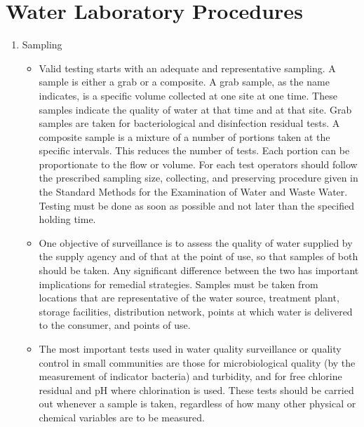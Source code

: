 
\chapter{Water Laboratory Procedures}

\begin{enumerate}
\item Sampling\\
\begin{itemize}
\item Valid testing starts with an adequate and representative sampling. A sample is either a grab or a composite. A grab sample, as the name indicates, is a specific volume collected at one site at one time. These samples indicate the quality of water at that time and at that site. Grab samples are taken for bacteriological and disinfection residual tests. A composite sample is a mixture of a number of portions taken at the specific intervals. This reduces the number of tests. Each portion can be proportionate to the flow or volume. For each test operators should follow the prescribed sampling size, collecting, and preserving procedure given in the Standard Methods for the Examination of Water and Waste Water. Testing must be done as soon as possible and not later than the specified holding time.

\item One objective of surveillance is to assess the quality of water supplied by the supply agency and of that at the point of use, so that samples of both should be taken. Any significant difference between the two has important implications for remedial strategies. Samples must be taken from locations that are representative of the water source, treatment plant, storage facilities, distribution network, points at which water is delivered to the consumer, and points of use.

\item The most important tests used in water quality surveillance or quality control in small communities are those for microbiological quality (by the measurement of indicator bacteria) and turbidity, and for free chlorine residual and pH where chlorination is used. These tests should be carried out whenever a sample is taken, regardless of how many other physical or chemical variables are to be measured.


\end{itemize}
\end{enumerate}
